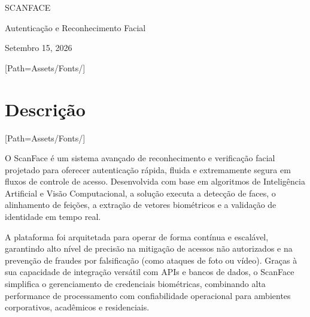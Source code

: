\documentclass{article}
\begin{document}
\begin{titlepage}

\begin{flushright}
\vspace{7.5cm}

\Huge SCANFACE

\vspace{0.5cm}

\Large Autenticação e Reconhecimento Facial

\vspace{8cm}

\normalsize Setembro 15, 2026

\end{flushright}
\end{titlepage}

\newpage

\renewcommand{\contentsname}{Sumário}
\tableofcontents
\newpage

\setmainfont{LEMONMILK-Bold.otf}[Path=Assets/Fonts/]
\section{Descrição}
\setmainfont{LEMONMILK-Regular.otf}[Path=Assets/Fonts/]

O ScanFace é um sistema avançado de reconhecimento e verificação facial projetado para oferecer autenticação rápida, fluida e extremamente segura em fluxos de controle de acesso. Desenvolvida com base em algoritmos de Inteligência Artificial e Visão Computacional, a solução executa a detecção de faces, o alinhamento de feições, a extração de vetores biométricos e a validação de identidade em tempo real.

A plataforma foi arquitetada para operar de forma contínua e escalável, garantindo alto nível de precisão na mitigação de acessos não autorizados e na prevenção de fraudes por falsificação (como ataques de foto ou vídeo). Graças à sua capacidade de integração versátil com APIs e bancos de dados, o ScanFace simplifica o gerenciamento de credenciais biométricas, combinando alta performance de processamento com confiabilidade operacional para ambientes corporativos, acadêmicos e residenciais.
\newpage
\end{document}

